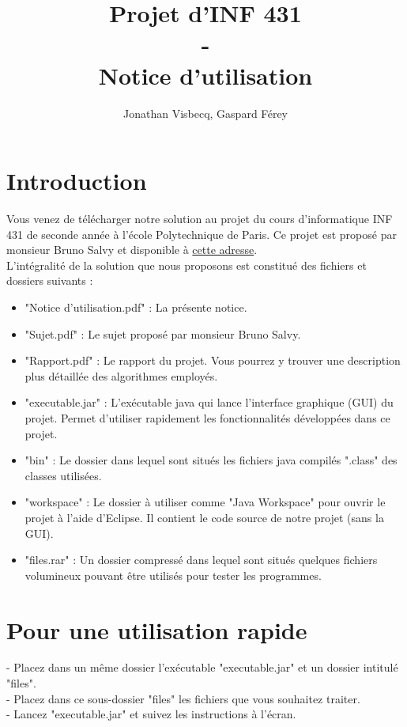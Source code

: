 \documentclass[12pt,a4paper,titlepage]{article}
\author{Jonathan Visbecq, Gaspard Férey}
\title{Projet d'INF 431 \\ - \\ Notice d'utilisation}
\begin{document}
\maketitle

\section{Introduction}
Vous venez de télécharger notre solution au projet du cours d'informatique INF 431 de seconde année à l'école Polytechnique de Paris. Ce projet est proposé par monsieur Bruno Salvy et disponible à \href{http://perso.ens-lyon.fr/bruno.salvy/INF431/Projet/INF431_-_Projet_Informatique.html}{cette adresse}.\\
L'intégralité de la solution que nous proposons est constitué des fichiers et dossiers suivants :
\begin{itemize}
\item "Notice d'utilisation.pdf" : La présente notice.
\item "Sujet.pdf" : Le sujet proposé par monsieur Bruno Salvy.
\item "Rapport.pdf" : Le rapport du projet. Vous pourrez y trouver une description plus détaillée des algorithmes employés. 
\item "executable.jar" : L'exécutable java qui lance l'interface graphique (GUI) du projet. Permet d'utiliser rapidement les fonctionnalités développées dans ce projet.
\item "bin" : Le dossier dans lequel sont situés les fichiers java compilés ".class" des classes utilisées.
\item "workspace" : Le dossier à utiliser comme "Java Workspace" pour ouvrir le projet à l'aide d'Eclipse. Il contient le code source de notre projet (sans la GUI).
\item "files.rar" : Un dossier compressé dans lequel sont situés quelques fichiers volumineux pouvant être utilisés pour tester les programmes.
\end{itemize}

\newpage
\section{Pour une utilisation rapide}
- Placez dans un même dossier l'exécutable "executable.jar" et un dossier intitulé "files".\\
- Placez dans ce sous-dossier "files" les fichiers que vous souhaitez traiter. \\
- Lancez "executable.jar" et suivez les instructions à l'écran.
\end{document}
